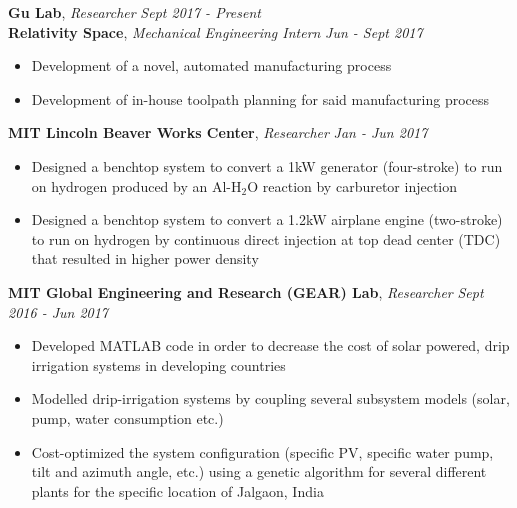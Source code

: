 \documentclass[9pt]{article}
\newenvironment{changemargin}[2]{%
  \begin{list}{}{%
    \setlength{\topsep}{0pt}%
    \setlength{\leftmargin}{#1}%
    \setlength{\rightmargin}{#2}%
    \setlength{\listparindent}{\parindent}%
    \setlength{\itemindent}{\parindent}%
    \setlength{\parsep}{\parskip}%
  }%
  \item[]}{\end{list}
}
\newcommand{\jobdescription}[1]{
	\begin{changemargin}{0.15in}{0.15in}
    \smallskip
		{#1}
    \medskip
	\end{changemargin}
}
\newcommand{\jobtitle}[3]{
	\textbf{#1}, \emph{#2} \hfill \emph{#3}\\
}
\newenvironment{body} {
	\vspace*{-16pt}
	\begin{changemargin}{-0.25in}{-0.5in}
  }	
	{\end{changemargin}
}
\begin{document}
\begin{body}
	\vspace{14pt}

  \jobtitle{Gu Lab}{Researcher}{Sept 2017 - Present}

	
  \jobtitle{Relativity Space}{Mechanical Engineering Intern}{Jun - Sept 2017}
  \jobdescription{
    \begin{itemize} \itemsep -0pt  %
      \item Development of a novel, automated manufacturing process
      \item Development of in-house toolpath planning for said manufacturing process
    \end{itemize}
  }

  \jobtitle{MIT Lincoln Beaver Works Center}{Researcher}{Jan - Jun 2017}
  \jobdescription{
    \begin{itemize} \itemsep -0pt  %
      \item Designed a benchtop system to convert a 1kW generator (four-stroke) to run on hydrogen produced by an Al-H$_2$O reaction by carburetor injection
      \item Designed a benchtop system to convert a 1.2kW airplane engine (two-stroke) to run on hydrogen by continuous direct injection at top dead center (TDC) that resulted in higher power density
    \end{itemize}
  }
  
  \jobtitle{MIT Global Engineering and Research (GEAR) Lab}{Researcher}{Sept 2016 - Jun 2017}
  \jobdescription{
    \begin{itemize} \itemsep -0pt  %
      \item Developed MATLAB code in order to decrease the cost of solar powered, drip irrigation systems in developing countries
      \item Modelled drip-irrigation systems by coupling several subsystem models (solar, pump, water consumption etc.)
      \item Cost-optimized the system configuration (specific PV, specific water pump, tilt and azimuth angle, etc.) using a genetic algorithm  for several different plants for the specific location of Jalgaon, India
    \end{itemize}
  }
  

\end{body}
\end{document}
